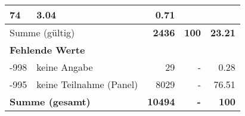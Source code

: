 \begin{longtable}{lXrrr}
       \num{74} &
       \num[round-mode=places,round-precision=2]{3.04} &
         \num[round-mode=places,round-precision=2]{0.71} \\
     \midrule
     \multicolumn{2}{l}{Summe (gültig)} &
       \textbf{\num{2436}} &
     \textbf{\num{100}} &
       \textbf{\num[round-mode=places,round-precision=2]{23.21}} \\
     \multicolumn{5}{l}{\textbf{Fehlende Werte}}\\
       -998 &
       keine Angabe &
         \num{29} &
        - &
         \num[round-mode=places,round-precision=2]{0.28} \\
       -995 &
       keine Teilnahme (Panel) &
         \num{8029} &
        - &
         \num[round-mode=places,round-precision=2]{76.51} \\
     \midrule
     \multicolumn{2}{l}{\textbf{Summe (gesamt)}} &
          \textbf{\num{10494}} &
        \textbf{-} &
        \textbf{\num{100}} \\
     \bottomrule
     \end{longtable}
     

